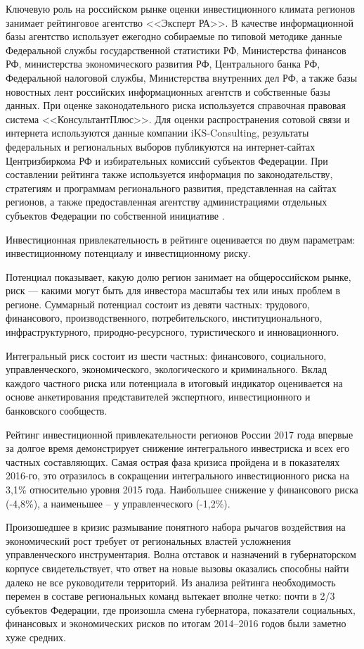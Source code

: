 Ключевую роль на российском рынке оценки инвестиционного климата регионов занимает рейтинговое агентство <<Эксперт РА>>.
В качестве информационной базы агентство использует ежегодно собираемые по типовой методике данные Федеральной службы государственной статистики РФ, Министерства финансов РФ, министерства экономического развития РФ, Центрального банка РФ, Федеральной налоговой службы, Министерства внутренних дел РФ, а также базы новостных лент российских информационных агентств и собственные базы данных.
При оценке законодательного риска используется справочная правовая система <<КонсультантПлюс>>.
Для оценки распространения сотовой связи и интернета используются данные компании iKS-Consulting, результаты федеральных и региональных выборов публикуются на интернет-сайтах Центризбиркома РФ и избирательных комиссий субъектов Федерации.
При составлении рейтинга также используется информация по законодательству, стратегиям и программам регионального развития, представленная на сайтах регионов, а также предоставленная агентству администрациями отдельных субъектов Федерации по собственной инициативе \cite[с. 57--62]{borisova}.

Инвестиционная привлекательность в рейтинге оценивается по двум параметрам: инвестиционному потенциалу и инвестиционному риску.

Потенциал показывает, какую долю регион занимает на общероссийском рынке, риск --- какими могут быть для инвестора масштабы тех или иных проблем в регионе.
Суммарный потенциал состоит из девяти частных: трудового, финансового, производственного, потребительского, институционального, инфраструктурного, природно-ресурсного, туристического и инновационного.

Интегральный риск состоит из шести частных: финансового, социального, управленческого, экономического, экологического и криминального.
Вклад каждого частного риска или потенциала в итоговый индикатор оценивается на основе анкетирования представителей экспертного, инвестиционного и банковского сообществ.

Рейтинг инвестиционной привлекательности регионов России 2017 года впервые за долгое время демонстрирует снижение интегрального инвестриска и всех его частных составляющих. Самая острая фаза кризиса пройдена и в показателях 2016-го, это отразилось в сокращении интегрального инвестиционного риска на 3,1\% относительно уровня 2015 года. Наибольшее снижение у финансового риска (-4,8\%), а наименьшее – у управленческого (-1,2\%).

Произошедшее в кризис размывание понятного набора рычагов воздействия на экономический рост требует от региональных властей усложнения управленческого инструментария. Волна отставок и назначений в губернаторском корпусе свидетельствует, что ответ на новые вызовы оказались способны найти далеко не все руководители территорий. Из анализа рейтинга необходимость перемен в составе региональных команд вытекает вполне четко: почти в 2/3 субъектов Федерации, где произошла смена губернатора, показатели социальных, финансовых и экономических рисков по итогам 2014–2016 годов были заметно хуже средних.

